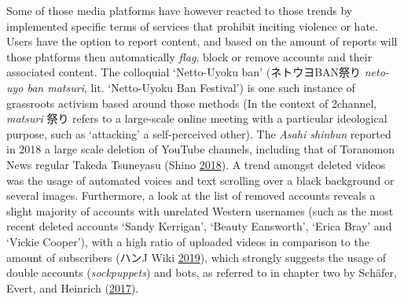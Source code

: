 \documentclass[10pt,british,A4paper,,openany]{memoir}
\begin{document}
Some of those media platforms have however reacted to those trends by
implemented specific terms of services that prohibit inciting violence
or hate. Users have the option to report content, and based on the
amount of reports will those platforms then automatically \emph{flag},
block or remove accounts and their associated content. The colloquial
`Netto-Uyoku ban' (ネトウヨBAN祭り \emph{neto-uyo ban matsuri}, lit.
`Netto-Uyoku Ban Festival') is one such instance of grassroots activism
based around those methods (In the context of 2channel, \emph{matsuri}
祭り refers to a large-scale online meeting with a particular
ideological purpose, such as `attacking' a self-perceived other). The
\emph{Asahi shinbun} reported in 2018 a large scale deletion of YouTube
channels, including that of Toranomon News regular Takeda Tsuneyasu
(Shino \protect\hyperlink{ref-shino_eng:_2018}{2018}). A trend amongst
deleted videos was the usage of automated voices and text scrolling over
a black background or several images. Furthermore, a look at the list of
removed accounts reveals a slight majority of accounts with unrelated
Western usernames (such as the most recent deleted accounts `Sandy
Kerrigan', `Beauty Eansworth', `Erica Bray' and `Vickie Cooper'), with a
high ratio of uploaded videos in comparison to the amount of subscribers
(ハンJ Wiki \protect\hyperlink{ref-j_wiki_completed_2019}{2019}), which
strongly suggests the usage of double accounts (\emph{sockpuppets}) and
bots, as referred to in chapter two by Schäfer, Evert, and Heinrich
(\protect\hyperlink{ref-schafer_japans_2017}{2017}).
\end{document}
